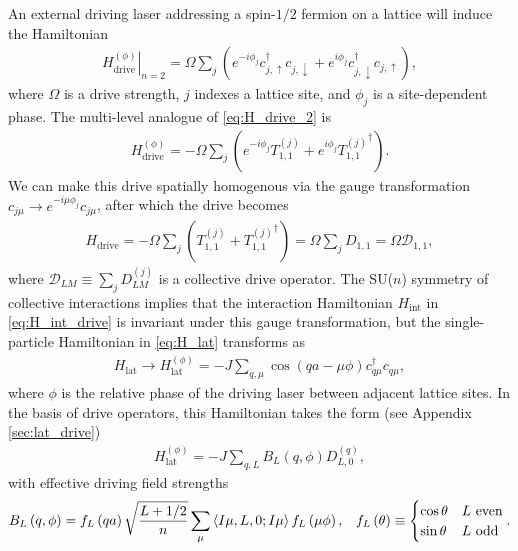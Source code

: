 \documentclass[nofootinbib,notitlepage,11pt]{revtex4-2}
\renewcommand{\t}{\text} %
\newcommand{\f}[2]{\dfrac{#1}{#2}} %
\newcommand{\p}[1]{\left(#1\right)} %
\newcommand{\bk}{\Braket} %
\newcommand{\1}{\mathds{1}}
\newcommand{\up}{\uparrow}
\newcommand{\dn}{\downarrow}
\newcommand{\D}{\mathcal{D}}
\begin{document}
An external driving laser addressing a spin-$1/2$ fermion on a lattice
will induce the Hamiltonian
\begin{align}
  \left. H_{\t{drive}}^{(\phi)} \right|_{n=2}
  = \Omega \sum_j
  \p{e^{-i\phi_j} c_{j,\up}^\dag c_{j,\dn}
    + e^{i\phi_j} c_{j,\dn}^\dag c_{j,\up}},
  \label{eq:H_drive_2}
\end{align}
where $\Omega$ is a drive strength, $j$ indexes a lattice site, and
$\phi_j$ is a site-dependent phase.  The multi-level analogue of
\eqref{eq:H_drive_2} is
\begin{align}
  H_{\t{drive}}^{(\phi)}
  = -\Omega \sum_j \p{e^{-i\phi_j} T_{1,1}^{(j)}
    + e^{i\phi_j} {T_{1,1}^{(j)}}^\dag}.
  \label{eq:H_drive}
\end{align}
We can make this drive spatially homogenous via the gauge
transformation $c_{j\mu} \to e^{-i\mu\phi_j} c_{j\mu}$, after which the
drive becomes
\begin{align}
  H_{\t{drive}}
  = -\Omega \sum_j\p{T_{1,1}^{(j)} + {T_{1,1}^{(j)}}^\dag}
  = \Omega \sum_j D_{1,1}
  = \Omega \D_{1,1},
\end{align}
where $\D_{LM}\equiv\sum_jD_{LM}^{(j)}$ is a collective drive
operator.  The SU($n$) symmetry of collective interactions implies
that the interaction Hamiltonian $H_{\t{int}}$ in
\eqref{eq:H_int_drive} is invariant under this gauge transformation,
but the single-particle Hamiltonian in \eqref{eq:H_lat} transforms as
\begin{align}
  H_{\t{lat}}
  \to H_{\t{lat}}^{(\phi)}
  = -J \sum_{q,\mu} \cos\p{qa-\mu\phi} c_{q\mu}^\dag c_{q\mu},
  \label{eq:H_lat_SOC}
\end{align}
where $\phi$ is the relative phase of the driving laser between
adjacent lattice sites.  In the basis of drive operators, this
Hamiltonian takes the form (see Appendix \ref{sec:lat_drive})
\begin{align}
  H_{\t{lat}}^{(\phi)} = -J \sum_{q,L} B_L\p{q,\phi} D_{L,0}^{(q)},
  \label{eq:H_lat_drive}
\end{align}
with effective driving field strengths
\begin{align}
  B_L\p{q,\phi} = f_L\p{qa} \sqrt{\f{L+1/2}{n}}
  \sum_\mu \bk{I\mu,L,0;I\mu} f_L\p{\mu\phi},
  &&
  f_L\p{\theta} \equiv
  \begin{cases}
    \cos\theta & L~\t{even} \\
    \sin\theta & L~\t{odd}
  \end{cases}.
\end{align}
\end{document}
